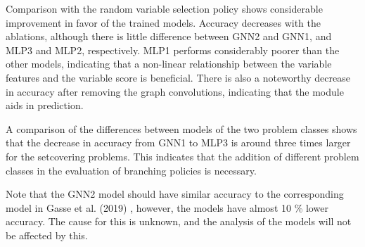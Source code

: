 Comparison with the random variable selection policy shows considerable improvement in favor of the trained models. Accuracy decreases with the ablations, although there is little difference between GNN2 and GNN1, and MLP3 and MLP2, respectively. MLP1 performs considerably poorer than the other models, indicating that a non-linear relationship between the variable features and the variable score is beneficial. There is also a noteworthy decrease in accuracy after removing the graph convolutions, indicating that the module aids in prediction.

A comparison of the differences between models of the two problem classes shows that the decrease in accuracy from GNN1 to MLP3 is around three times larger for the setcovering problems. This indicates that the addition of different problem classes in the evaluation of branching policies is necessary.

Note that the GNN2 model should have similar accuracy to the corresponding model in Gasse et al. (2019) \cite{gasse2019exact}, however, the models have almost 10 \% lower accuracy. The cause for this is unknown, and the analysis of the models will not be affected by this. 

